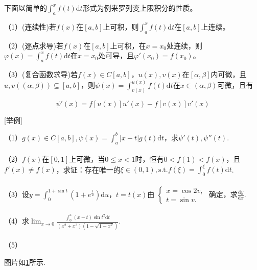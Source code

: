 \documentclass{SCIS2020cn}
\begin{document}
下面以简单的$\displaystyle\int_a^{x}f(t)\text{d}t$形式为例来罗列变上限积分的性质。

（1）(连续性)若$f(x)$在$[a,b]$上可积，则$\displaystyle\int_a^{x}f(t)\text{d}t$在$[a,b]$上连续。

（2）(逐点求导)若$f(x)$在$[a,b]$上可积，在$x=x_0$处连续，则$\displaystyle\varphi(x)=\int_a^{x}f(t)\text{d}t$在$x=x_0$处可导，且$\varphi'(x_0)=f(x_0)$。

（3）(复合函数求导)若$f(x)\in{}C[a,b]$，$u(x),v(x)$在$[\alpha,\beta]$内可微，且$u,v((\alpha,\beta))\subseteq[a,b]$，则$\displaystyle\psi(x)=\int_{v(x)}^{u(x)}{f(t)\text{d}t}$在$x\in(\alpha,\beta)$可微，且有

\begin{equation}
\psi'(x)=f[u(x)]u'(x)-f[v(x)]v'(x)
\end{equation}

[举例]

（1）$\displaystyle{}g(x)\in{}C[a,b],\psi(x)=\int_a^b{|x-t|g(t)\text{d}t}$，求$\psi'(t),\psi''(t)$.\\\\

（2）$f(x)$在$[0,1]$上可微，当$0\leqslant{}x<1$时，恒有$0<f(1)<f(x)$，且$f'(x)\neq{}f(x)$，求证：存在唯一的$\displaystyle\xi\in(0,1),\text{s.t.}f(\xi)=\int_0^{\xi}{f(t)\text{d}t}$.\\\\

（3）设$\displaystyle{}y=\int_0^{1+\sin{t}}{(1+e^{\frac{1}{u}})\text{d}u}$，$t=t(x)$由
$\left\{\begin{array}{ll}

x=\cos{2v},\\

t=\sin{v}.

\end{array}\right.$
确定，求$\displaystyle\frac{\text{d}y}{\text{d}x}$.\\\\

（4）求$\displaystyle\lim_{x\rightarrow0}{\frac{\int_0^x{(x-t)\sin{t^2}\text{d}t}}{(x^2+x^3)(1-\sqrt{1-x^2})}}$.\\\\

（5）

\newpage

图片如\ref{fig1}所示.
\begin{figure}[!t]
\centering
\label{fig1}
\end{figure}
\end{document}
